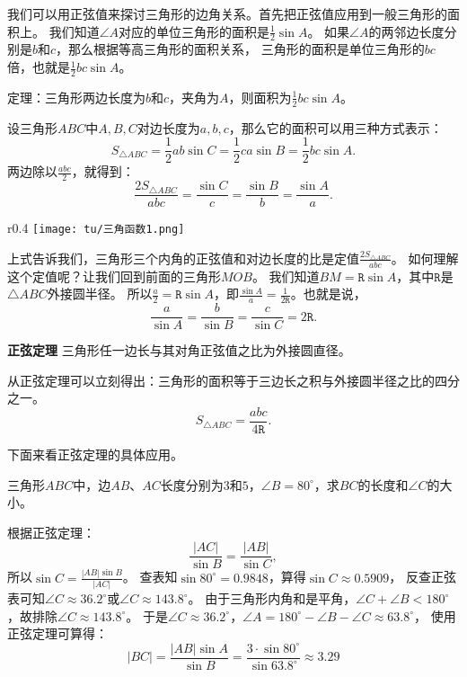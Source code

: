 \documentclass[12pt,UTF8]{ctexbook}
\begin{document}
我们可以用正弦值来探讨三角形的边角关系。首先把正弦值应用到一般三角形的面积上。
我们知道$\angle A$对应的单位三角形的面积是$\frac{1}{2}\sin A$。
如果$\angle A$的两邻边长度分别是$b$和$c$，那么根据等高三角形的面积关系，
三角形的面积是单位三角形的$bc$倍，也就是$\frac{1}{2}bc\sin A$。

定理：三角形两边长度为$b$和$c$，夹角为$A$，则面积为$\frac{1}{2}bc\sin A$。

设三角形$ABC$中$A,B,C$对边长度为$a,b,c$，那么它的面积可以用三种方式表示：
$$ S_{\triangle ABC} = \frac{1}{2}ab\sin C = \frac{1}{2}ca\sin B = \frac{1}{2}bc\sin A.$$
两边除以$\frac{abc}{2}$，就得到：
$$  \frac{2S_{\triangle ABC}}{abc} = \frac{\sin C}{c} = \frac{\sin B}{b} = \frac{\sin A}{a}. $$

\begin{wrapfigure}[8]{r}{0.4\textwidth} %
    \vspace{-30pt}
    \flushright
    \texttt{[image: tu/三角函数1.png]}
\end{wrapfigure}

上式告诉我们，三角形三个内角的正弦值和对边长度的比是定值$\frac{2S_{\triangle ABC}}{abc}$。
如何理解这个定值呢？让我们回到前面的三角形$MOB$。
我们知道$BM = \mathtt{R}\sin A$，其中$\mathtt{R}$是$\triangle ABC$外接圆半径。
所以$ \frac{a}{2} = \mathtt{R}\sin A$，即$ \frac{\sin A}{a} = \frac{1}{2\mathtt{R}}$。也就是说，
$$ \frac{a}{\sin A} = \frac{b}{\sin B} = \frac{c}{\sin C} =  2\mathtt{R}. $$

\begin{tm}{\textbf{正弦定理} }\label{tm:2-1-10}
    三角形任一边长与其对角正弦值之比为外接圆直径。
\end{tm}
从正弦定理可以立刻得出：三角形的面积等于三边长之积与外接圆半径之比的四分之一。
$$S_{\triangle ABC} = \frac{abc}{4\mathtt{R}}. $$ 

下面来看正弦定理的具体应用。

\begin{ex}\label{ex:2-1-10}
    三角形$ABC$中，边$AB$、$AC$长度分别为$3$和$5$，$\angle B = 80^\circ$，求$BC$的长度和$\angle C$的大小。    
\end{ex}
\begin{so}
    根据正弦定理：
    $$ \frac{|AC|}{\sin B} = \frac{|AB|}{\sin C},$$
    所以$\sin C = \frac{|AB|\sin B}{|AC|}$。
    查表知$\sin 80^\circ = 0.9848$，算得$\sin C \approx 0.5909$，
    反查正弦表可知$\angle C \approx 36.2^\circ$或$\angle C \approx 143.8^\circ$。
    由于三角形内角和是平角，$\angle C + \angle B < 180^\circ$，故排除$\angle C \approx 143.8^\circ$。
    于是$\angle C \approx 36.2^\circ$，$\angle A = 180^\circ - \angle B - \angle C \approx 63.8^\circ$，
    使用正弦定理可算得：
    $$ |BC| = \frac{|AB|\sin A}{\sin B} = \frac{3 \cdot \sin 80^\circ}{\sin 63.8^\circ} \approx 3.29 $$
\end{so}
\end{document}
